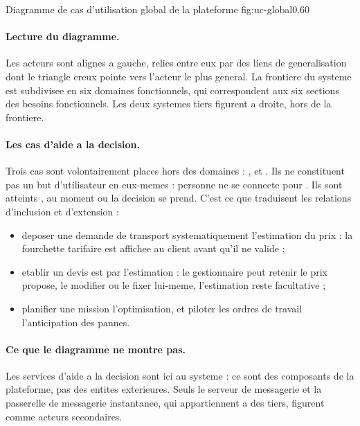   {Diagramme de cas d'utilisation global de la plateforme \sujetCourt}
  {fig:uc-global}{0.60}

\paragraph{Lecture du diagramme.}
Les acteurs sont alignes a gauche, relies entre eux par des liens de
generalisation dont le triangle creux pointe vers l'acteur le plus
general. La frontiere du systeme est subdivisee en six domaines
fonctionnels, qui correspondent aux six sections des besoins
fonctionnels. Les deux systemes tiers figurent a droite, hors de la
frontiere.

\paragraph{Les cas d'aide a la decision.}
Trois cas sont volontairement places hors des domaines :
,  et . Ils ne constituent pas un
but d'utilisateur en eux-memes : personne ne se connecte pour
. Ils sont atteints , au moment ou la decision se prend. C'est ce que traduisent
les relations d'inclusion et d'extension :

\begin{itemize}
  \item deposer une demande de transport 
    systematiquement l'estimation du prix : la fourchette tarifaire est
    affichee au client avant qu'il ne valide ;
  \item etablir un devis est  par l'estimation :
    le gestionnaire peut retenir le prix propose, le modifier ou le fixer
    lui-meme, l'estimation reste facultative ;
  \item planifier une mission  l'optimisation, et
    piloter les ordres de travail  l'anticipation des
    pannes.
\end{itemize}

\paragraph{Ce que le diagramme ne montre pas.}
Les services d'aide a la decision sont ici  au
systeme : ce sont des composants de la plateforme, pas des entites
exterieures. Seuls le serveur de messagerie et la passerelle de
messagerie instantanee, qui appartiennent a des tiers, figurent comme
acteurs secondaires.

